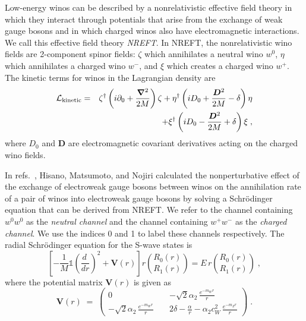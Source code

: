 \documentclass[%
 reprint,
 amsmath,amssymb,
 aps,
]{revtex4-1}
\begin{document}
Low-energy winos can be described by a nonrelativistic effective field theory in which they interact through potentials that arise from the exchange of weak gauge bosons and in which charged winos also have electromagnetic interactions. 
We call this effective field theory {\it NREFT}. 
In NREFT, the nonrelativistic wino fields are 2-component spinor fields: $\zeta$ which annihilates a neutral wino $w^0$, $\eta$ which annihilates a charged wino $w^-$, and $\xi$ which creates a charged wino $w^+$. 
The kinetic terms for winos in the Lagrangian density are
\begin{eqnarray}
\mathcal{L}_{\rm kinetic} &=& \zeta^\dagger\left(i\partial_0+\frac{\bm{\nabla}^2}{2M}\right) \zeta 
+ \eta^\dagger\left(iD_0+\frac{\bm{D}^2}{2M} -\delta\right) \eta
\nonumber\\
&& + \xi^\dagger\left(iD_0-\frac{\bm{D}^2}{2M} +\delta\right) \xi \;,
\label{eq:kineticLHMN}
\end{eqnarray}
where $D_0$ and $\bm{D}$ are electromagnetic covariant derivatives acting on the charged wino fields.

In refs.~\cite{Hisano:2003ec,Hisano:2004ds}, Hisano, Matsumoto, and Nojiri calculated the nonperturbative effect of the exchange of electroweak gauge bosons between winos on the annihilation rate of a pair of winos into electroweak gauge bosons by solving a Schr\"odinger equation that can be derived from NREFT.
We refer to the channel containing $w^0 w^0$ as the {\it neutral channel} and the channel containing $w^+ w^-$ as the {\it charged channel}. 
We use the indices 0 and 1 to label these channels respectively. The radial Schr\"odinger equation for the S-wave states is
\begin{equation}
\left[ -\frac{1}{M} \mathds{1} \left( \frac{d\ }{dr} \right)^2
+\bm{V}(r) \right] r \binom{R_0(r)}{R_1(r)} = E\,  r \binom{R_0(r)}{R_1(r)} \;,
\label{eq:radialSchrEq}
\end{equation}
where the potential matrix $\bm{V}(r)$ is given as
\begin{equation}
\bm{V}(r) \;=\; \begin{pmatrix} 0 &\; & -\sqrt{2}\alpha_2 \,\frac{e^{-m_W r}}{r} \\ 
-\sqrt{2}\alpha_2 \,\frac{e^{-m_W r}}{r} &\;& 2\delta- 
\frac{\alpha}{r} - \alpha_2 c^2_W\, \frac{e^{-m_Z r}}{r} \end{pmatrix} \;.
\label{eq:V-matrix}
\end{equation}
\end{document}
